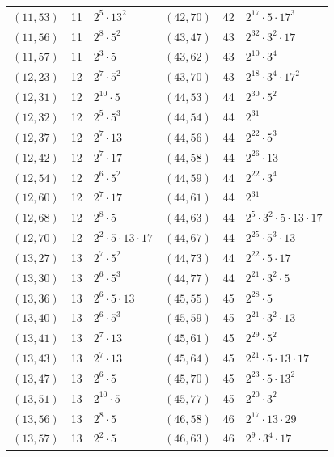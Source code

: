 \documentclass[11pt]{article}
\begin{document}
\begin{longtable}{@{}lrl@{\qquad}lrl@{}}
$(11,53)$ & 11 & $2^{5}\cdot 13^{2}$ & $(42,70)$ & 42 & $2^{17}\cdot 5\cdot 17^{3}$\\
$(11,56)$ & 11 & $2^{8}\cdot 5^{2}$ & $(43,47)$ & 43 & $2^{32}\cdot 3^{2}\cdot 17$\\
$(11,57)$ & 11 & $2^{3}\cdot 5$ & $(43,62)$ & 43 & $2^{10}\cdot 3^{4}$\\
$(12,23)$ & 12 & $2^{7}\cdot 5^{2}$ & $(43,70)$ & 43 & $2^{18}\cdot 3^{4}\cdot 17^{2}$\\
$(12,31)$ & 12 & $2^{10}\cdot 5$ & $(44,53)$ & 44 & $2^{30}\cdot 5^{2}$\\
$(12,32)$ & 12 & $2^{5}\cdot 5^{3}$ & $(44,54)$ & 44 & $2^{31}$\\
$(12,37)$ & 12 & $2^{7}\cdot 13$ & $(44,56)$ & 44 & $2^{22}\cdot 5^{3}$\\
$(12,42)$ & 12 & $2^{7}\cdot 17$ & $(44,58)$ & 44 & $2^{26}\cdot 13$\\
$(12,54)$ & 12 & $2^{6}\cdot 5^{2}$ & $(44,59)$ & 44 & $2^{22}\cdot 3^{4}$\\
$(12,60)$ & 12 & $2^{7}\cdot 17$ & $(44,61)$ & 44 & $2^{31}$\\
$(12,68)$ & 12 & $2^{8}\cdot 5$ & $(44,63)$ & 44 & $2^{5}\cdot 3^{2}\cdot 5\cdot 13\cdot 17$\\
$(12,70)$ & 12 & $2^{2}\cdot 5\cdot 13\cdot 17$ & $(44,67)$ & 44 & $2^{25}\cdot 5^{3}\cdot 13$\\
$(13,27)$ & 13 & $2^{7}\cdot 5^{2}$ & $(44,73)$ & 44 & $2^{22}\cdot 5\cdot 17$\\
$(13,30)$ & 13 & $2^{6}\cdot 5^{3}$ & $(44,77)$ & 44 & $2^{21}\cdot 3^{2}\cdot 5$\\
$(13,36)$ & 13 & $2^{6}\cdot 5\cdot 13$ & $(45,55)$ & 45 & $2^{28}\cdot 5$\\
$(13,40)$ & 13 & $2^{6}\cdot 5^{3}$ & $(45,59)$ & 45 & $2^{21}\cdot 3^{2}\cdot 13$\\
$(13,41)$ & 13 & $2^{7}\cdot 13$ & $(45,61)$ & 45 & $2^{29}\cdot 5^{2}$\\
$(13,43)$ & 13 & $2^{7}\cdot 13$ & $(45,64)$ & 45 & $2^{21}\cdot 5\cdot 13\cdot 17$\\
$(13,47)$ & 13 & $2^{6}\cdot 5$ & $(45,70)$ & 45 & $2^{23}\cdot 5\cdot 13^{2}$\\
$(13,51)$ & 13 & $2^{10}\cdot 5$ & $(45,77)$ & 45 & $2^{20}\cdot 3^{2}$\\
$(13,56)$ & 13 & $2^{8}\cdot 5$ & $(46,58)$ & 46 & $2^{17}\cdot 13\cdot 29$\\
$(13,57)$ & 13 & $2^{2}\cdot 5$ & $(46,63)$ & 46 & $2^{9}\cdot 3^{4}\cdot 17$\\

\end{longtable}
\end{document}
